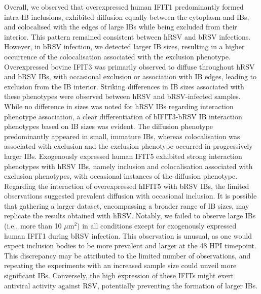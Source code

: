 Overall, we observed that overexpressed human IFIT1 predominantly formed intra-IB inclusions, exhibited diffusion equally between the cytoplasm and IBs, and colocalised with the edges of large IBs while being excluded from their interior. This pattern remained consistent between hRSV and bRSV infections. However, in bRSV infection, we detected larger IB sizes, resulting in a higher occurrence of the colocalisation associated with the exclusion phenotype. Overexpressed bovine IFIT3 was primarily observed to diffuse throughout hRSV and bRSV IBs, with occasional exclusion or association with IB edges, leading to exclusion from the IB interior. Striking differences in IB sizes associated with these phenotypes were observed between hRSV and bRSV-infected samples. While no difference in sizes was noted for hRSV IBs regarding interaction phenotype association, a clear differentiation of bIFIT3-bRSV IB interaction phenotypes based on IB sizes was evident. The diffusion phenotype predominantly appeared in small, immature IBs, whereas colocalisation was associated with exclusion and the exclusion phenotype occurred in progressively larger IBs. Exogenously expressed human IFIT5 exhibited strong interaction phenotypes with hRSV IBs, namely inclusion and colocalisation associated with exclusion phenotypes, with occasional instances of the diffusion phenotype. Regarding the interaction of overexpressed hIFIT5 with bRSV IBs, the limited observations suggested prevalent diffusion with occasional inclusion. It is possible that gathering a larger dataset, encompassing a broader range of IB sizes, may replicate the results obtained with hRSV. Notably, we failed to observe large IBs (i.e., more than 10 \(\mu \mbox{m}^2\)) in all conditions except for exogenously expressed human IFIT1 during bRSV infection. This observation is unusual, as one would expect inclusion bodies to be more prevalent and larger at the 48 HPI timepoint. This discrepancy may be attributed to the limited number of observations, and repeating the experiments with an increased sample size could unveil more significant IBs. Conversely, the high expression of these IFITs might exert antiviral activity against RSV, potentially preventing the formation of larger IBs.